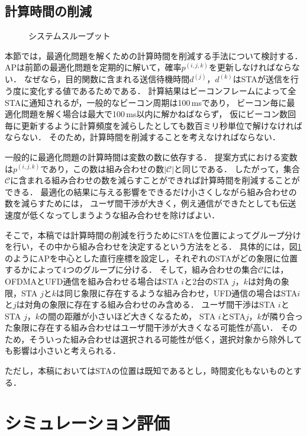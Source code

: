 \documentclass[technicalreport]{ieicej}
\newcommand{\pijk}{p^{(i,j,k)}}
\newcommand{\mthc}{\mathcal C}
\begin{document}
	\subsection{計算時間の削減}\label{sec:time}
		\begin{figure}[t]
			\centering
			\caption{システムスループット}
			\label{fig:time_image}
		\end{figure}
		本節では，最適化問題を解くための計算時間を削減する手法について検討する．
		APは前節の最適化問題を定期的に解いて，確率$\pijk$を更新しなければならない．
		なぜなら，目的関数に含まれる送信待機時間$d^{(j)}$，$d^{(k)}$はSTAが送信を行う度に変化する値であるためである．
		計算結果はビーコンフレームによって全STAに通知されるが，一般的なビーコン周期は100\,msであり，
		ビーコン毎に最適化問題を解く場合は最大で100\,ms以内に解かねばならず，
		仮にビーコン数回毎に更新するように計算頻度を減らしたとしても数百ミリ秒単位で解けなければならない．
		そのため，計算時間を削減することを考えなければならない．
		\par
		一般的に最適化問題の計算時間は変数の数に依存する．
		提案方式における変数は$\pijk$であり，この数は組み合わせの数$|\mthc|$と同じである．
		したがって，集合$\mthc$に含まれる組み合わせの数を減らすことができれば計算時間を削減することができる．
		最適化の結果に与える影響をできるだけ小さくしながら組み合わせの数を減らすためには，
		ユーザ間干渉が大きく，例え通信ができたとしても伝送速度が低くなってしまうような組み合わせを除けばよい．
		\par
		そこで，本稿では計算時間の削減を行うためにSTAを位置によってグループ分けを行い，その中から組み合わせを決定するという方法をとる．
		具体的には，図\ref{fig:time_image}のようにAPを中心とした直行座標を設定し，それぞれのSTAがどの象限に位置するかによって4つのグループに分ける．
		そして，組み合わせの集合$\mthc$には，OFDMAとUFD通信を組み合わせる場合はSTA $i$と2台のSTA $j$，$k$は対角の象限，STA $j$と$k$は同じ象限に存在するような組み合わせ，UFD通信の場合はSTA$i$と$j$は対角の象限に存在する組み合わせのみ含める．
		ユーザ間干渉はSTA $i$とSTA $j$，$k$の間の距離が小さいほど大きくなるため，
		STA $i$とSTA$j$，$k$が隣り合った象限に存在する組み合わせはユーザ間干渉が大きくなる可能性が高い．
		そのため，そういった組み合わせは選択される可能性が低く，選択対象から除外しても影響は小さいと考えられる．
		\par
		ただし，本稿においてはSTAの位置は既知であるとし，時間変化もないものとする．


\section{シミュレーション評価}
\end{document}
